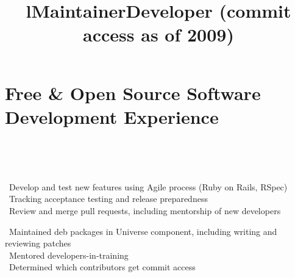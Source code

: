     \section{Free \& Open Source Software Development Experience}
        \begin{format}
            \\
            \title{l}\\
            \body
        \end{format}

        \location{}
        \title{Maintainer}
        \begin{position}
            \textbullet \ Develop and test new features using Agile process (Ruby on Rails, RSpec)\\
            \textbullet \ Tracking acceptance testing and release preparedness\\
            \textbullet \ Review and merge pull requests, including mentorship of new developers
        \end{position}


        \location{}
        \title{Developer (commit access as of 2009)}
        \begin{position}
            \textbullet \ Maintained deb packages in Universe component, including writing and reviewing patches\\
            \textbullet \ Mentored developers-in-training\\
            \textbullet \ Determined which contributors get commit access
        \end{position}

